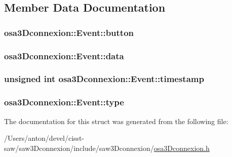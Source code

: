\subsection{Member Data Documentation}
\hypertarget{structosa3_dconnexion_1_1_event_a7cf9cc55aff27ec81a95735ae1906b0d}{}
\subsubsection[{button}]{ osa3\+Dconnexion\+::\+Event\+::button}\label{structosa3_dconnexion_1_1_event_a7cf9cc55aff27ec81a95735ae1906b0d}
\hypertarget{structosa3_dconnexion_1_1_event_a328ab06ff93f5426fd240fcd5a647449}{}
\subsubsection[{data}]{ osa3\+Dconnexion\+::\+Event\+::data}\label{structosa3_dconnexion_1_1_event_a328ab06ff93f5426fd240fcd5a647449}
\hypertarget{structosa3_dconnexion_1_1_event_a2f0ccc260bb38dfe16957e33e5752a35}{}
\subsubsection[{timestamp}]{\setlength{\rightskip}{0pt plus 5cm}unsigned int osa3\+Dconnexion\+::\+Event\+::timestamp}\label{structosa3_dconnexion_1_1_event_a2f0ccc260bb38dfe16957e33e5752a35}
\hypertarget{structosa3_dconnexion_1_1_event_a5deeb96b286234ec1e97387494676d05}{}
\subsubsection[{type}]{ osa3\+Dconnexion\+::\+Event\+::type}\label{structosa3_dconnexion_1_1_event_a5deeb96b286234ec1e97387494676d05}


The documentation for this struct was generated from the following file\+:\begin{DoxyCompactItemize}
\item 
/\+Users/anton/devel/cisst-\/saw/saw3\+Dconnexion/include/saw3\+Dconnexion/\hyperlink{osa3_dconnexion_8h}{osa3\+Dconnexion.\+h}\end{DoxyCompactItemize}
